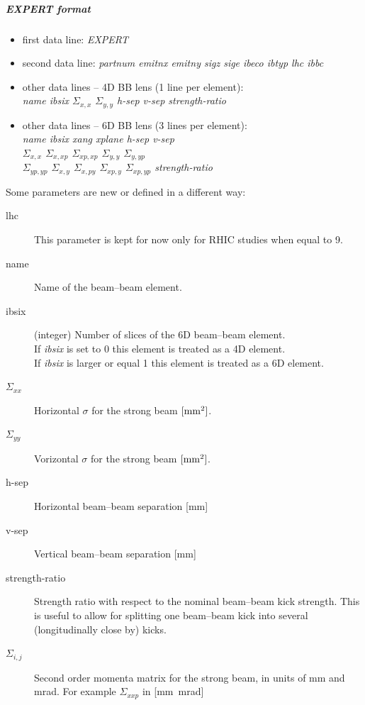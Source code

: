 \subparagraph{EXPERT format}

\begin{itemize}
\item first data line: {\em EXPERT}
\item second data line: {\em partnum emitnx emitny sigz sige ibeco
    ibtyp lhc ibbc} 
\item other data lines -- 4D BB lens (1 line per element): \\
{\em name ibsix $\Sigma_{x,x}$ $\Sigma_{y,y}$ h-sep v-sep strength-ratio}
\item other data lines -- 6D BB lens (3 lines per element): \\
{\em name ibsix xang xplane h-sep v-sep} \\
{\em $\Sigma_{x,x}$ $\Sigma_{x,xp}$ $\Sigma_{xp,xp}$ $\Sigma_{y,y}$ $\Sigma_{y,yp}$} \\
{\em $\Sigma_{yp,yp}$ $\Sigma_{x,y}$ $\Sigma_{x,py}$ $\Sigma_{xp,y}$ $\Sigma_{xp,yp}$ strength-ratio} \\
\end{itemize}

Some parameters are new or defined in a different way:
\begin{description}
\item [lhc] This parameter is kept for now only for RHIC studies when equal to 9.
\item [name] Name of the beam--beam element.
\item [ibsix] (integer) Number of slices of the 6D beam--beam element.\\
  If {\it ibsix} is set to 0 this element is treated as a 4D element.\\
  If {\it ibsix} is larger or equal 1 this element is treated as a 6D element.
\item [$\Sigma_{xx}$] Horizontal $\sigma$ for the strong beam $\rm{[mm^2]}$.
\item [$\Sigma_{yy}$] Vorizontal $\sigma$ for the strong beam $\rm{[mm^2]}$.
\item [h-sep] Horizontal beam--beam separation [mm]
\item [v-sep] Vertical beam--beam separation [mm]
\item [strength-ratio] Strength ratio with respect to the nominal beam--beam kick strength.
  This is useful to allow for splitting one beam--beam kick into several (longitudinally close by) kicks.
\item [$\Sigma_{i,j}$] Second order momenta matrix for the strong beam, in units of mm and mrad.
  For example $\Sigma_{xxp}$ in [mm\ mrad]
\end{description}

